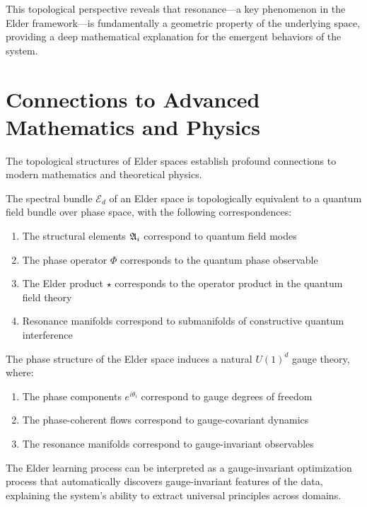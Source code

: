 This topological perspective reveals that resonance—a key phenomenon in the Elder framework—is fundamentally a geometric property of the underlying space, providing a deep mathematical explanation for the emergent behaviors of the system.

\section{Connections to Advanced Mathematics and Physics}

The topological structures of Elder spaces establish profound connections to modern mathematics and theoretical physics.

\begin{theorem}
The spectral bundle $\mathcal{E}_d$ of an Elder space is topologically equivalent to a quantum field bundle over phase space, with the following correspondences:
\begin{enumerate}
    \item The structural elements $\mathfrak{A}_{i}$ correspond to quantum field modes
    \item The phase operator $\Phi$ corresponds to the quantum phase observable
    \item The Elder product $\star$ corresponds to the operator product in the quantum field theory
    \item Resonance manifolds correspond to submanifolds of constructive quantum interference
\end{enumerate}
\end{theorem}

\begin{theorem}
The phase structure of the Elder space induces a natural $U(1)^d$ gauge theory, where:
\begin{enumerate}
    \item The phase components $e^{i\theta_i}$ correspond to gauge degrees of freedom
    \item The phase-coherent flows correspond to gauge-covariant dynamics
    \item The resonance manifolds correspond to gauge-invariant observables
\end{enumerate}
\end{theorem}

\begin{corollary}
The Elder learning process can be interpreted as a gauge-invariant optimization process that automatically discovers gauge-invariant features of the data, explaining the system's ability to extract universal principles across domains.
\end{corollary}

